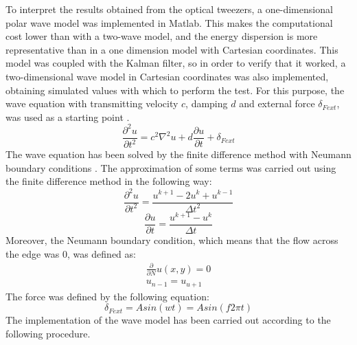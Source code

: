 \documentclass[12pt, a4paper]{article} %
\begin{document}
	To interpret the results obtained from the optical tweezers, a one-dimensional polar wave model was implemented in Matlab. This makes the computational cost lower than with a two-wave model, and the energy dispersion is more representative than in a one dimension model with Cartesian coordinates. This model was coupled with the Kalman filter, so in order to verify that it worked, a two-dimensional wave model in Cartesian coordinates was also implemented, obtaining simulated values with which to perform the test. For this purpose, the wave equation with transmitting velocity $c$, damping $d$ and external force $\delta_{Fext}$, was used as a starting point \cite{achenbach2012wave, d'alembert_1749}.
	\setlength{\parskip}{4mm}
	\begin{equation} \label{eqn:wave_model}
		\frac{\partial^{2}u}{\partial t^{2}} = c^{2}\nabla^{2}u + d\frac{\partial u}{\partial t} + \delta_{Fext}
	\end{equation}
	The wave equation has been solved by the finite difference method \cite{petter2017finite} with Neumann boundary conditions \cite{mathews2000metodos}. The approximation of some terms was carried out using the finite difference method in the following way:
	\begin{equation} \label{eqn:deltau_deltat2}
		\frac{\partial^{2}u}{\partial t^{2}} = \frac{u^{k + 1} - 2u^{k} + u^{k - 1}}{\Delta t^{2}} 
	\end{equation}
	\begin{equation} \label{eqn:deltau_deltat}
		\frac{\partial u}{\partial t} = \frac{u^{k + 1} - u^{k}}{\Delta t}
	\end{equation}
	Moreover, the Neumann boundary condition, which means that the flow across the edge was 0, was defined as:
	\begin{equation} \label{eqn:neumann}
		\begin{array}{ l }
			\frac{\partial}{\partial N} u(x, y) = 0\\
			u_{n-1} = u_{u+1}
		\end{array}
	\end{equation}
	The force was defined by the following equation:
	\begin{equation} \label{eqn:force}
		\delta_{Fext} = Asin(wt) = Asin(f2\pi t)
	\end{equation}
	The implementation of the wave model has been carried out according to the following procedure.
	
	\setlength{\parindent}{0pt}
	
	\setlength{\parskip}{8mm}
	
\end{document}
